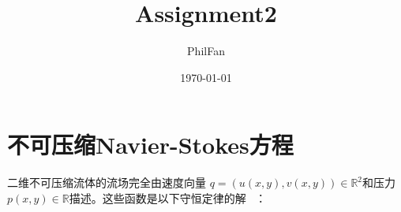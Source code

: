 \documentclass[12pt, a4paper]{article}
\title{Assignment2}
\author{PhilFan}
\date{\today}
\numberwithin{equation}{section} %
\begin{document}
\maketitle
\setcounter{page}{0}
\maketitle
\thispagestyle{empty}



\newpage
{}
\setcounter{page}{1}
\tableofcontents

\newpage
\setcounter{page}{1}
\pagestyle{sectionheader} %

\section{不可压缩Navier-Stokes方程}
\label{sec:a}
二维不可压缩流体的流场完全由速度向量 $q = (u(x, y), v(x, y))\in \mathbb{R}^2 $和压力 $p(x, y) \in \mathbb{R} $描述。这些函数是以下守恒定律的解 ~\cite{refa}：
\end{document}
